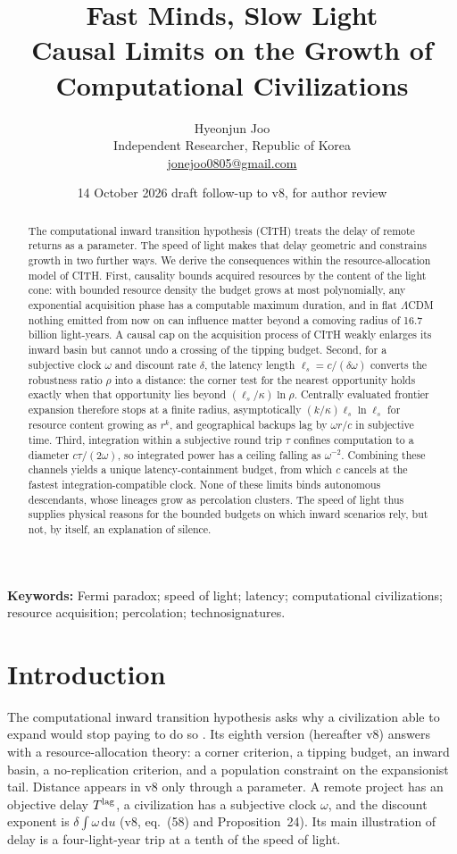 \documentclass[11pt,a4paper]{article}
\title{Fast Minds, Slow Light\\[3pt]
\large Causal Limits on the Growth of Computational Civilizations}
\author{Hyeonjun Joo\\[3pt]\normalsize Independent Researcher, Republic of Korea\\
\normalsize\href{mailto:jonejoo0805@gmail.com}{jonejoo0805@gmail.com}}
\date{14 October 2026 \textemdash{} draft follow-up to \CITH{} v8, for author review}
\theoremstyle{definition}
\newcommand{\CITH}{\textsc{CITH}}
\newcommand{\dd}{\,\mathrm{d}}
\newcommand{\ls}{\ell_s}
\begin{document}
\maketitle
\begin{abstract}
The computational inward transition hypothesis (\CITH) treats the delay of
remote returns as a parameter. The speed of light makes that delay geometric
and constrains growth in two further ways. We derive the consequences within
the resource-allocation model of \CITH. First, causality bounds acquired
resources by the content of the light cone: with bounded resource density the
budget grows at most polynomially, any exponential acquisition phase has a
computable maximum duration, and in flat $\Lambda$CDM nothing emitted from now
on can influence matter beyond a comoving radius of 16.7 billion light-years.
A causal cap on the acquisition process of \CITH{} weakly enlarges its inward
basin but cannot undo a crossing of the tipping budget. Second, for a subjective
clock $\omega$ and discount rate $\delta$, the latency length $\ls=c/(\delta\omega)$
converts the robustness ratio $\rho$ into a distance: the corner test for the
nearest opportunity holds exactly when that opportunity lies beyond
$(\ls/\kappa)\ln\rho$. Centrally evaluated frontier expansion therefore stops
at a finite radius, asymptotically $(k/\kappa)\ls\ln\ls$ for resource content
growing as $r^k$, and geographical backups lag by $\omega r/c$ in subjective
time. Third, integration within a subjective round trip $\tau$ confines
computation to a diameter $c\tau/(2\omega)$, so integrated power has a ceiling
falling as $\omega^{-2}$. Combining these channels yields a unique
latency-containment budget, from which $c$ cancels at the fastest
integration-compatible clock. None of these limits binds autonomous
descendants, whose lineages grow as percolation clusters. The speed of light
thus supplies physical reasons for the bounded budgets on which inward
scenarios rely, but not, by itself, an explanation of silence.
\end{abstract}
\noindent\textbf{Keywords:} Fermi paradox; speed of light; latency;
computational civilizations; resource acquisition; percolation; technosignatures.

\section{Introduction}
\label{sec:intro}
The computational inward transition hypothesis asks why a civilization able
to expand would stop paying to do so \citep{Joo2026v8}. Its eighth version
(hereafter v8) answers with a resource-allocation theory: a corner criterion,
a tipping budget, an inward basin, a no-replication criterion, and a
population constraint on the expansionist tail. Distance appears in v8 only
through a parameter. A remote project has an objective delay
$T^{\rm lag}$, a civilization has a subjective clock $\omega$, and the
discount exponent is $\delta\int\omega\dd u$ (v8, eq.~(58) and Proposition~24). Its main
illustration of delay is a four-light-year trip at a tenth of the speed of
light.
\end{document}
